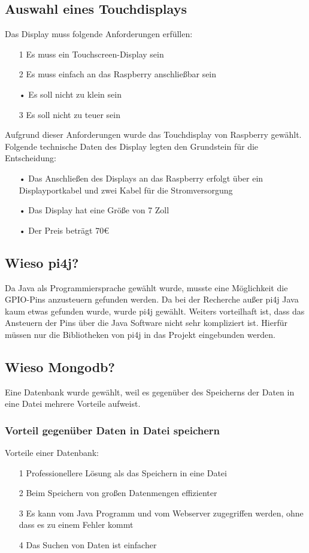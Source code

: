 \subsection{Auswahl eines Touchdisplays}
Das Display muss folgende Anforderungen erfüllen:
\begin{itemize}
\item[1] Es muss ein Touchscreen-Display sein
\item[2] Es muss einfach an das Raspberry anschließbar sein
\item[•] Es soll nicht zu klein sein
\item[3] Es soll nicht zu teuer sein
\end{itemize}

Aufgrund dieser Anforderungen wurde das Touchdisplay von Raspberry gewählt.
\\ Folgende technische Daten des Display legten den Grundstein für die Entscheidung:
\begin{itemize}
\item[•] Das Anschließen des Displays an das Raspberry erfolgt über ein Displayportkabel und zwei Kabel für die Stromversorgung
\item[•] Das Display hat eine Größe von 7 Zoll
\item[•] Der Preis beträgt 70\euro{}
\end{itemize}

\subsection{Wieso pi4j?}
Da Java als Programmiersprache gewählt wurde, musste eine Möglichkeit die GPIO-Pins anzusteuern gefunden werden.
Da bei der Recherche außer pi4j Java kaum etwas gefunden wurde, wurde pi4j gewählt. Weiters vorteilhaft ist, dass das Ansteuern der Pins über die Java Software nicht sehr kompliziert ist. Hierfür müssen nur die Bibliotheken von pi4j in das Projekt eingebunden werden.

\subsection{Wieso Mongodb?}
Eine Datenbank wurde gewählt, weil es gegenüber des Speicherns der Daten in eine Datei mehrere Vorteile aufweist. 
\subsubsection{Vorteil gegenüber Daten in Datei speichern}
Vorteile einer Datenbank:
\begin{itemize}
\item[1] Professionellere Lösung als das Speichern in eine Datei
\item[2] Beim Speichern von großen Datenmengen effizienter
\item[3] Es kann vom Java Programm und vom Webserver zugegriffen werden, ohne dass es zu einem Fehler kommt
\item[4] Das Suchen von Daten ist einfacher
\end{itemize}
